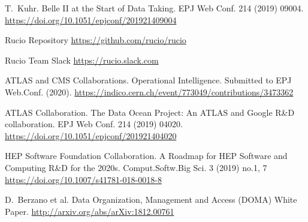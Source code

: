 \documentclass[11pt]{article}
\begin{document}
\begin{thebibliography}{99}
\begin{small}
T.~Kuhr.
\newblock Belle II at the Start of Data Taking.
\newblock EPJ Web Conf. 214 (2019) 09004.
\newblock \href{https://doi.org/10.1051/epjconf/201921409004}{https://doi.org/10.1051/epjconf/201921409004}

Rucio Repository
\newblock \href{https://github.com/rucio/rucio}{https://github.com/rucio/rucio}

Rucio Team Slack
\newblock \href{https://rucio.slack.com}{https://rucio.slack.com}

ATLAS and CMS Collaborations.
\newblock Operational Intelligence.
\newblock Submitted to EPJ Web.Conf. (2020).
\newblock \href{https://indico.cern.ch/event/773049/contributions/3473362/attachments/1937928/3212143/CHEP_2019_Operational_Intelligence_-_rev05.pdf}{https://indico.cern.ch/event/773049/contributions/3473362}

ATLAS Collaboration.
\newblock The Data Ocean Project: An ATLAS and Google R\&D collaboration.
\newblock EPJ Web Conf. 214 (2019) 04020.
\newblock \href{https://doi.org/10.1051/epjconf/201921404020}{https://doi.org/10.1051/epjconf/201921404020}

HEP Software Foundation Collaboration.
\newblock A Roadmap for HEP Software and Computing R\&D for the 2020s.
\newblock Comput.Softw.Big Sci. 3 (2019) no.1, 7
\newblock \href{https://doi.org/10.1007/s41781-018-0018-8}{https://doi.org/10.1007/s41781-018-0018-8}

D.~Berzano et al.
\newblock Data Organization, Management and Access (DOMA)
\newblock White Paper.
\newblock \href{http://arxiv.org/abs/arXiv:1812.00761}{http://arxiv.org/abs/arXiv:1812.00761}

\end{small}
\end{thebibliography} 
\end{document}
